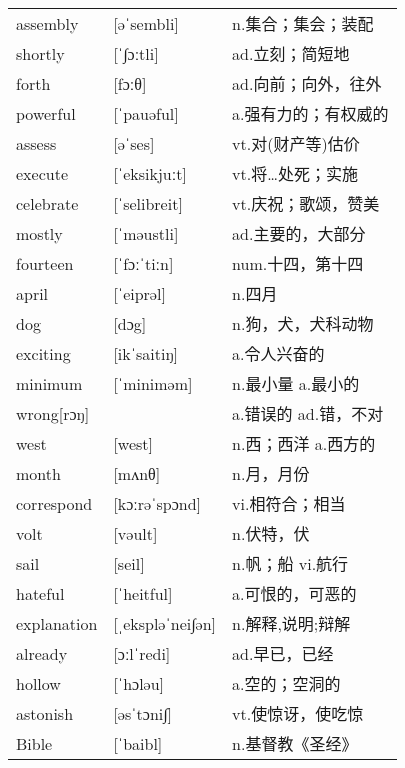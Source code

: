 \documentclass[a4paper]{article}
\begin{document}
\section{}
\begin{tabular}{l l l}

assembly & [əˈsembli] & n.集合；集会；装配 \\
shortly & [ˈ∫ɔːtli] & ad.立刻；简短地 \\
forth & [fɔːθ] & ad.向前；向外，往外 \\
powerful & [ˈpauəful] & a.强有力的；有权威的 \\
assess & [əˈses] & vt.对(财产等)估价 \\
execute & [ˈeksikjuːt] & vt.将…处死；实施 \\
celebrate & [ˈselibreit] & vt.庆祝；歌颂，赞美 \\
mostly & [ˈməustli] & ad.主要的，大部分 \\
fourteen & [ˈfɔːˈtiːn] & num.十四，第十四 \\
april & [ˈeiprəl] & n.四月 \\
dog & [dɔg] & n.狗，犬，犬科动物 \\
exciting & [ikˈsaitiŋ] & a.令人兴奋的 \\
minimum & [ˈminiməm] & n.最小量 a.最小的 \\
wrong[rɔŋ] &  & a.错误的 ad.错，不对 \\
west & [west] & n.西；西洋 a.西方的 \\
month & [mʌnθ] & n.月，月份 \\
correspond & [kɔːrəˈspɔnd] & vi.相符合；相当 \\
volt & [vəult] & n.伏特，伏 \\
sail & [seil] & n.帆；船 vi.航行 \\
hateful & [ˈheitful] & a.可恨的，可恶的 \\
explanation & [ˌekspləˈnei∫ən] & n.解释,说明;辩解 \\
already & [ɔːlˈredi] & ad.早已，已经 \\
hollow & [ˈhɔləu] & a.空的；空洞的 \\
astonish & [əsˈtɔni∫] & vt.使惊讶，使吃惊 \\
Bible & [ˈbaibl] & n.基督教《圣经》 \\

\end{tabular}
\end{document}
